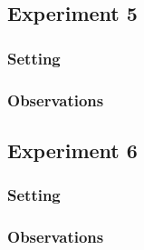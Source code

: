 \documentclass[11pt]{article}
\begin{document}
\subsection{Experiment 5}

\subsubsection{Setting}

\subsubsection{Observations}

\subsection{Experiment 6}

\subsubsection{Setting}

\subsubsection{Observations}
\end{document}
